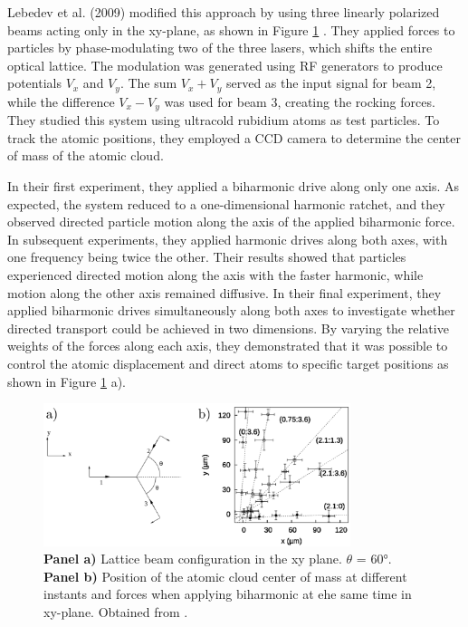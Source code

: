  Lebedev et al. (2009) modified this approach by using three linearly polarized beams acting only in the xy-plane, as shown in Figure \ref{fig:lebedevexperiment} \cite{lebedev2009two}. They applied forces to particles by phase-modulating two of the three lasers, which shifts the entire optical lattice. The modulation was generated using RF generators to produce potentials $V_x$ and $V_y$. The sum $V_x + V_y$ served as the input signal for beam 2, while the difference $V_x - V_y$ was used for beam 3, creating the rocking forces. They studied this system using ultracold rubidium atoms as test particles. To track the atomic positions, they employed a CCD camera to determine the center of mass of the atomic cloud.

 In their first experiment, they applied a biharmonic drive along only one axis. As expected, the system reduced to a one-dimensional harmonic ratchet, and they observed directed particle motion along the axis of the applied biharmonic force. In subsequent experiments, they applied harmonic drives along both axes, with one frequency being twice the other. Their results showed that particles experienced directed motion along the axis with the faster harmonic, while motion along the other axis remained diffusive. In their final experiment, they applied biharmonic drives simultaneously along both axes to investigate whether directed transport could be achieved in two dimensions. By varying the relative weights of the forces along each axis, they demonstrated that it was possible to control the atomic displacement and direct atoms to specific target positions as shown in Figure \ref{fig:lebedevexperiment} a).


 \begin{figure}[h]
  \begin{center}
    \includegraphics[width=0.80\textwidth]{figures/LebedevExperiment.png}
  \end{center}
  \caption[Lebedev experiment.]{\textbf{Panel a)} Lattice beam configuration in the xy plane. $\theta$ = 60°. \textbf{Panel b)} Position of the atomic cloud center of mass at different instants and forces when applying biharmonic at ehe same time in xy-plane. Obtained from \cite{lebedev2009two}.}\label{fig:lebedevexperiment}
 \end{figure}


